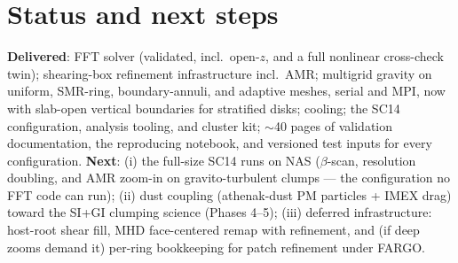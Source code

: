 \documentclass[11pt]{article}
\begin{document}
\section*{Status and next steps}
\textbf{Delivered}: FFT solver (validated, incl.\ open-$z$, and a full
nonlinear cross-check twin); shearing-box refinement infrastructure incl.\
AMR; multigrid gravity on uniform, SMR-ring, boundary-annuli, and adaptive
meshes, serial and MPI, now with slab-open vertical boundaries for stratified
disks; cooling; the SC14 configuration, analysis tooling, and cluster kit;
$\sim$40 pages of validation documentation, the reproducing notebook, and
versioned test inputs for every configuration.
\textbf{Next}: (i) the full-size SC14 runs on NAS ($\beta$-scan, resolution
doubling, and AMR zoom-in on gravito-turbulent clumps --- the configuration no
FFT code can run); (ii) dust coupling (athenak-dust PM particles + IMEX drag)
toward the SI+GI clumping science (Phases 4--5); (iii) deferred
infrastructure: host-root shear fill, MHD face-centered remap with refinement,
and (if deep zooms demand it) per-ring bookkeeping for patch refinement under
FARGO.
\end{document}
